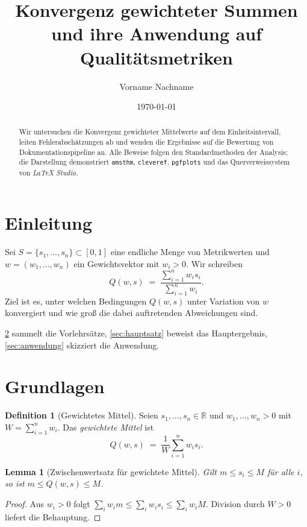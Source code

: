 \documentclass[11pt,reqno]{amsart}
\title[Konvergenz gewichteter Summen]{Konvergenz gewichteter Summen\\
  und ihre Anwendung auf Qualitätsmetriken}
\author{Vorname Nachname}
\date{\today}
\newtheorem{lemma}[theorem]{Lemma}
\theoremstyle{definition}
\newtheorem{definition}[theorem]{Definition}
\theoremstyle{remark}
\numberwithin{equation}{section}
\begin{document}
\begin{abstract}
  Wir untersuchen die Konvergenz gewichteter Mittelwerte auf dem Einheitsintervall,
  leiten Fehlerabschätzungen ab und wenden die Ergebnisse auf die Bewertung von
  Dokumentationspipeline an. Alle Beweise folgen den Standardmethoden der
  Analysis; die Darstellung demonstriert \texttt{amsthm}, \texttt{cleveref},
  \texttt{pgfplots} und das Querverweissystem von \emph{LaTeX Studio}.
\end{abstract}

\section{Einleitung}
\label{sec:intro}

Sei $S = \{s_1,\dots,s_n\} \subset [0,1]$ eine endliche Menge von Metrikwerten
und $w = (w_1,\dots,w_n)$ ein Gewichtsvektor mit $w_i > 0$. Wir schreiben
\begin{equation}
  \label{eq:weighted}
  Q(w,s) \;=\; \frac{\sum_{i=1}^{n} w_i s_i}{\sum_{i=1}^{n} w_i}.
\end{equation}
Ziel ist es, unter welchen Bedingungen $Q(w,s)$ unter Variation von $w$
konvergiert und wie groß die dabei auftretenden Abweichungen sind.

\cref{sec:grundlagen} sammelt die Vorlehrsätze, \cref{sec:hauptsatz} beweist
das Hauptergebnis, \cref{sec:anwendung} skizziert die Anwendung.

\section{Grundlagen}
\label{sec:grundlagen}

\begin{definition}[Gewichtetes Mittel]
  \label{def:mittel}
  Seien $s_1,\dots,s_n \in \mathbb{R}$ und $w_1,\dots,w_n > 0$ mit
  $W = \sum_{i=1}^n w_i$. Das \emph{gewichtete Mittel} ist
  \[
    Q(w,s) \;=\; \frac{1}{W}\sum_{i=1}^{n} w_i s_i .
  \]
\end{definition}

\begin{lemma}[Zwischenwertsatz für gewichtete Mittel]
  \label{lem:zwischenwert}
  Gilt $m \le s_i \le M$ für alle $i$, so ist
  $m \le Q(w,s) \le M$.
\end{lemma}

\begin{proof}
  Aus $w_i > 0$ folgt $\sum_i w_i m \le \sum_i w_i s_i \le \sum_i w_i M$.
  Division durch $W > 0$ liefert die Behauptung.
\end{proof}
\end{document}
